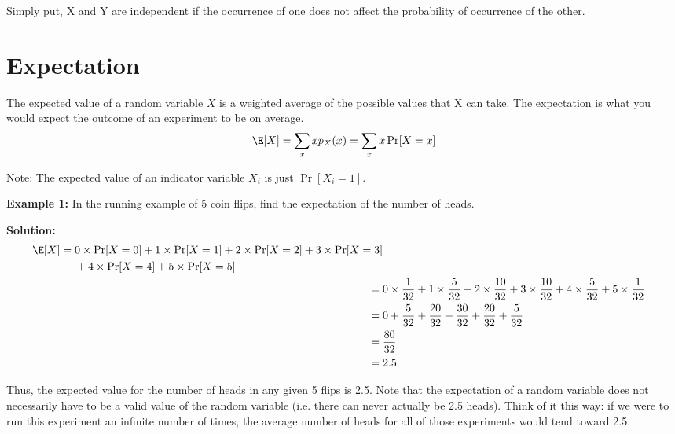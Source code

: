 Simply put, X and Y are independent if the occurrence of one does not affect the probability of occurrence of the other.

\section*{Expectation}

\begin{definition}
    The expected value of a random variable $X$ is a weighted average of the possible values that X can take. The expectation is what you would expect the outcome of an experiment to be on average.
    \[
    \E[X] = \sum_{x} x p_{X}(x) = \sum_{x} x \Pr[X = x]
    \]
\end{definition}
Note: The expected value of an indicator variable $X_{i}$ is just $\Pr[X_{i} = 1]$.

\vspace{5mm}

\textbf{Example 1:}
In the running example of 5 coin flips, find the expectation of the number of heads.

\vspace{2.5mm}

\textbf{Solution:}
\begin{align*}
\begin{split}
    \E[X] ={}& 0 \times \Pr[X = 0] + 1 \times \Pr[X = 1] + 2 \times \Pr[X = 2] + 3 \times \Pr[X = 3]\\
    & + 4 \times \Pr[X = 4] + 5 \times \Pr[X = 5]
\end{split}\\
    ={}& 0 \times \frac{1}{32} + 1 \times \frac{5}{32} + 2 \times \frac{10}{32} + 3 \times \frac{10}{32} + 4 \times \frac{5}{32} + 5 \times \frac{1}{32} \\
    ={}& 0 + \frac{5}{32} + \frac{20}{32} + \frac{30}{32} + \frac{20}{32} + \frac{5}{32} \\
    ={}& \frac{80}{32} \\
    ={}& 2.5
\end{align*}

Thus, the expected value for the number of heads in any given 5 flips is 2.5. Note that the expectation of a random variable does not necessarily have to be a valid value of the random variable (i.e. there can never actually be 2.5 heads). Think of it this way: if we were to run this experiment an infinite number of times, the average number of heads for all of those experiments would tend toward 2.5.

\vspace{5mm}

